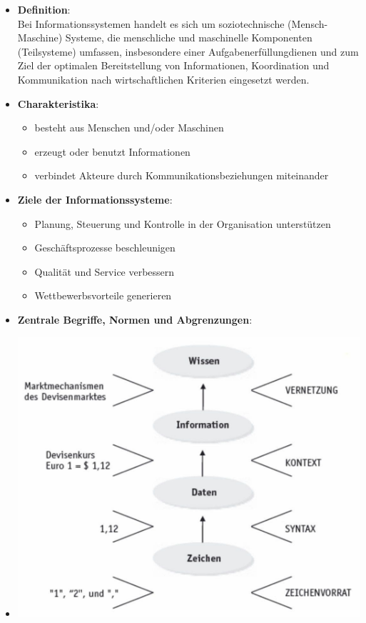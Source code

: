 \documentclass[12pt,a4paper]{article}
\begin{document}
\begin{itemize}
   \item \textbf{Definition}:\\
         Bei Informationssystemen handelt es sich um soziotechnische (Mensch-Maschine) Systeme, die menschliche und maschinelle Komponenten (Teilsysteme) umfassen, insbesondere einer Aufgabenerfüllungdienen und zum Ziel der optimalen Bereitstellung von Informationen, Koordination und Kommunikation nach wirtschaftlichen Kriterien eingesetzt werden.

   \item \textbf{Charakteristika}:
      \begin{itemize}
         \item besteht aus Menschen und/oder Maschinen
         \item erzeugt oder benutzt Informationen
         \item verbindet Akteure durch Kommunikationsbeziehungen miteinander
      \end{itemize}
         
   \item \textbf{Ziele der Informationssysteme}:
			\begin{itemize}
			    \item Planung, Steuerung und Kontrolle in der Organisation unterstützen
			    \item Geschäftsprozesse beschleunigen
			    \item Qualität und Service verbessern
			    \item Wettbewerbsvorteile generieren
			\end{itemize}
   
   \item \textbf{Zentrale Begriffe, Normen und Abgrenzungen}:
   \item[] \includegraphics[scale=0.6]{ZentraleBegriffe-Normen-Abgrenzungen.jpg}


\end{itemize}
\end{document}
